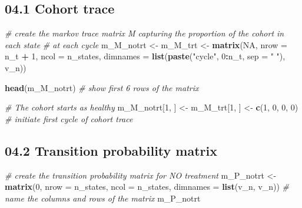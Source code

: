 \documentclass[
]{article}
\newenvironment{Shaded}{\begin{snugshade}}{\end{snugshade}}
\newcommand{\CommentTok}[1]{\textcolor[rgb]{0.56,0.35,0.01}{\textit{#1}}}
\newcommand{\DataTypeTok}[1]{\textcolor[rgb]{0.13,0.29,0.53}{#1}}
\newcommand{\DecValTok}[1]{\textcolor[rgb]{0.00,0.00,0.81}{#1}}
\newcommand{\KeywordTok}[1]{\textcolor[rgb]{0.13,0.29,0.53}{\textbf{#1}}}
\newcommand{\NormalTok}[1]{#1}
\newcommand{\OperatorTok}[1]{\textcolor[rgb]{0.81,0.36,0.00}{\textbf{#1}}}
\newcommand{\OtherTok}[1]{\textcolor[rgb]{0.56,0.35,0.01}{#1}}
\newcommand{\StringTok}[1]{\textcolor[rgb]{0.31,0.60,0.02}{#1}}
\begin{document}
\hypertarget{cohort-trace}{%
\subsection{04.1 Cohort trace}\label{cohort-trace}}

\begin{Shaded}
\begin{Highlighting}[]
\CommentTok{# create the markov trace matrix M capturing the proportion of the cohort in each state }
\CommentTok{# at each cycle}
\NormalTok{m_M_notrt <-}\StringTok{ }\NormalTok{m_M_trt <-}\StringTok{ }\KeywordTok{matrix}\NormalTok{(}\OtherTok{NA}\NormalTok{, }
                               \DataTypeTok{nrow     =}\NormalTok{ n_t }\OperatorTok{+}\StringTok{ }\DecValTok{1}\NormalTok{, }\DataTypeTok{ncol =}\NormalTok{ n_states,}
                               \DataTypeTok{dimnames =} \KeywordTok{list}\NormalTok{(}\KeywordTok{paste}\NormalTok{(}\StringTok{"cycle"}\NormalTok{, }\DecValTok{0}\OperatorTok{:}\NormalTok{n_t, }\DataTypeTok{sep =} \StringTok{" "}\NormalTok{), v_n))}

\KeywordTok{head}\NormalTok{(m_M_notrt) }\CommentTok{# show first 6 rows of the matrix }

\CommentTok{# The cohort starts as healthy}
\NormalTok{m_M_notrt[}\DecValTok{1}\NormalTok{, ] <-}\StringTok{ }\NormalTok{m_M_trt[}\DecValTok{1}\NormalTok{, ] <-}\StringTok{ }\KeywordTok{c}\NormalTok{(}\DecValTok{1}\NormalTok{, }\DecValTok{0}\NormalTok{, }\DecValTok{0}\NormalTok{, }\DecValTok{0}\NormalTok{) }\CommentTok{# initiate first cycle of cohort trace }
\end{Highlighting}
\end{Shaded}

\hypertarget{transition-probability-matrix}{%
\subsection{04.2 Transition probability
matrix}\label{transition-probability-matrix}}

\begin{Shaded}
\begin{Highlighting}[]
\CommentTok{# create the transition probability matrix for NO treatment}
\NormalTok{m_P_notrt  <-}\StringTok{ }\KeywordTok{matrix}\NormalTok{(}\DecValTok{0}\NormalTok{,}
                     \DataTypeTok{nrow =}\NormalTok{ n_states,}
                     \DataTypeTok{ncol =}\NormalTok{ n_states,}
                     \DataTypeTok{dimnames =} \KeywordTok{list}\NormalTok{(v_n, v_n)) }\CommentTok{# name the columns and rows of the matrix}
\NormalTok{m_P_notrt}
\end{Highlighting}
\end{Shaded}
\end{document}
